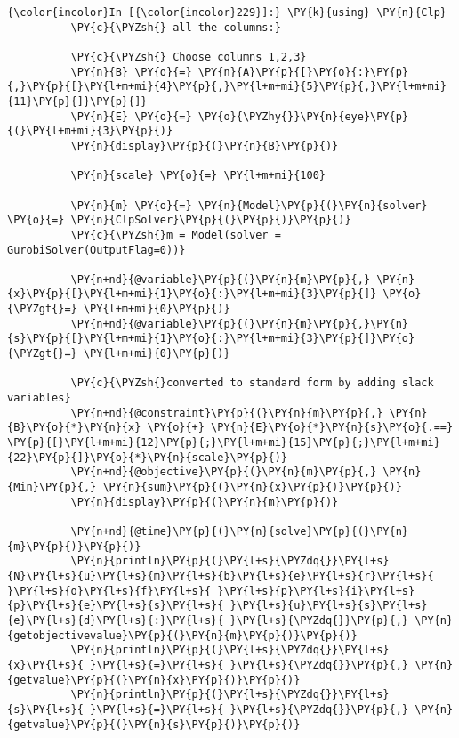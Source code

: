     \begin{Verbatim}[commandchars=\\\{\}]
{\color{incolor}In [{\color{incolor}229}]:} \PY{k}{using} \PY{n}{Clp}
          \PY{c}{\PYZsh{} all the columns:}
          
          \PY{c}{\PYZsh{} Choose columns 1,2,3}
          \PY{n}{B} \PY{o}{=} \PY{n}{A}\PY{p}{[}\PY{o}{:}\PY{p}{,}\PY{p}{[}\PY{l+m+mi}{4}\PY{p}{,}\PY{l+m+mi}{5}\PY{p}{,}\PY{l+m+mi}{11}\PY{p}{]}\PY{p}{]}
          \PY{n}{E} \PY{o}{=} \PY{o}{\PYZhy{}}\PY{n}{eye}\PY{p}{(}\PY{l+m+mi}{3}\PY{p}{)}
          \PY{n}{display}\PY{p}{(}\PY{n}{B}\PY{p}{)}
          
          \PY{n}{scale} \PY{o}{=} \PY{l+m+mi}{100}
          
          \PY{n}{m} \PY{o}{=} \PY{n}{Model}\PY{p}{(}\PY{n}{solver} \PY{o}{=} \PY{n}{ClpSolver}\PY{p}{(}\PY{p}{)}\PY{p}{)}
          \PY{c}{\PYZsh{}m = Model(solver = GurobiSolver(OutputFlag=0))}
          
          \PY{n+nd}{@variable}\PY{p}{(}\PY{n}{m}\PY{p}{,} \PY{n}{x}\PY{p}{[}\PY{l+m+mi}{1}\PY{o}{:}\PY{l+m+mi}{3}\PY{p}{]} \PY{o}{\PYZgt{}=} \PY{l+m+mi}{0}\PY{p}{)}
          \PY{n+nd}{@variable}\PY{p}{(}\PY{n}{m}\PY{p}{,}\PY{n}{s}\PY{p}{[}\PY{l+m+mi}{1}\PY{o}{:}\PY{l+m+mi}{3}\PY{p}{]}\PY{o}{\PYZgt{}=} \PY{l+m+mi}{0}\PY{p}{)}
          
          \PY{c}{\PYZsh{}converted to standard form by adding slack variables}
          \PY{n+nd}{@constraint}\PY{p}{(}\PY{n}{m}\PY{p}{,} \PY{n}{B}\PY{o}{*}\PY{n}{x} \PY{o}{+} \PY{n}{E}\PY{o}{*}\PY{n}{s}\PY{o}{.==} \PY{p}{[}\PY{l+m+mi}{12}\PY{p}{;}\PY{l+m+mi}{15}\PY{p}{;}\PY{l+m+mi}{22}\PY{p}{]}\PY{o}{*}\PY{n}{scale}\PY{p}{)} 
          \PY{n+nd}{@objective}\PY{p}{(}\PY{n}{m}\PY{p}{,} \PY{n}{Min}\PY{p}{,} \PY{n}{sum}\PY{p}{(}\PY{n}{x}\PY{p}{)}\PY{p}{)}
          \PY{n}{display}\PY{p}{(}\PY{n}{m}\PY{p}{)}
          
          \PY{n+nd}{@time}\PY{p}{(}\PY{n}{solve}\PY{p}{(}\PY{n}{m}\PY{p}{)}\PY{p}{)}
          \PY{n}{println}\PY{p}{(}\PY{l+s}{\PYZdq{}}\PY{l+s}{N}\PY{l+s}{u}\PY{l+s}{m}\PY{l+s}{b}\PY{l+s}{e}\PY{l+s}{r}\PY{l+s}{ }\PY{l+s}{o}\PY{l+s}{f}\PY{l+s}{ }\PY{l+s}{p}\PY{l+s}{i}\PY{l+s}{p}\PY{l+s}{e}\PY{l+s}{s}\PY{l+s}{ }\PY{l+s}{u}\PY{l+s}{s}\PY{l+s}{e}\PY{l+s}{d}\PY{l+s}{:}\PY{l+s}{ }\PY{l+s}{\PYZdq{}}\PY{p}{,} \PY{n}{getobjectivevalue}\PY{p}{(}\PY{n}{m}\PY{p}{)}\PY{p}{)}
          \PY{n}{println}\PY{p}{(}\PY{l+s}{\PYZdq{}}\PY{l+s}{x}\PY{l+s}{ }\PY{l+s}{=}\PY{l+s}{ }\PY{l+s}{\PYZdq{}}\PY{p}{,} \PY{n}{getvalue}\PY{p}{(}\PY{n}{x}\PY{p}{)}\PY{p}{)}
          \PY{n}{println}\PY{p}{(}\PY{l+s}{\PYZdq{}}\PY{l+s}{s}\PY{l+s}{ }\PY{l+s}{=}\PY{l+s}{ }\PY{l+s}{\PYZdq{}}\PY{p}{,} \PY{n}{getvalue}\PY{p}{(}\PY{n}{s}\PY{p}{)}\PY{p}{)}
\end{Verbatim}


